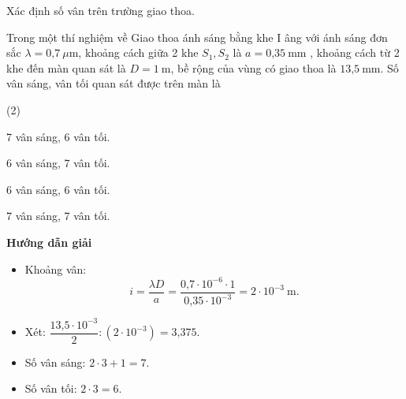 \begin{dang}{Xác định số vân trên trường giao thoa.}

	{Trong một thí nghiệm về Giao thoa ánh sáng bằng khe I âng với ánh sáng đơn sắc $\lambda  = \text{0,7}\ \mu \text{m}$, khoảng cách giữa 2 khe $S_1, S_2$ là $a = \text{0,35}\ \text{mm}$ , khoảng cách từ 2 khe đến màn quan sát là $D = 1\ \text{m}$, bề rộng của vùng có giao thoa là $\text{13,5}\ \text{mm}$. Số vân sáng, vân tối quan sát được trên màn là
		\begin{mcq}(2)
			\item 7 vân sáng, 6 vân tối.        
			\item 6 vân sáng, 7 vân tối.
			\item 6 vân sáng, 6 vân tối.          
			\item 7 vân sáng, 7 vân tối.
		\end{mcq}
	}
	{
		\begin{center}
			\textbf{Hướng dẫn giải}
		\end{center}
		
		
		\begin{itemize}
			\item Khoảng vân: 
			\begin{equation*}
			i=\dfrac{\lambda D}{a}=\dfrac{\text {0,7} \cdot 10^{-6} \cdot 1}{\text{0,35} \cdot 10^{-3}}= 2 \cdot 10^{-3}\ \text{m}.
			\end{equation*}
			\item Xét: $\dfrac{\text{13,5}\cdot 10^{-3}}{2} : (2 \cdot 10^{-3}) =\text{3,375}$.
			\item Số vân sáng: $2 \cdot 3 + 1 = 7$.
			\item Số vân tối: $2 \cdot 3 =6$. 
			
		\end{itemize}
		
}
\end{dang}
